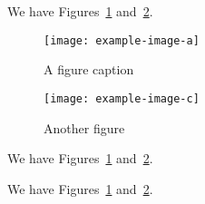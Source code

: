 \documentclass{article}
\begin{document}
We have Figures~\ref{fig:caption-a} and~\ref{fig:caption-c}.

\begin{figure}[ht]
  \centering\texttt{[image: example-image-a]}
  \caption{A figure caption}\label{fig:caption-a}
\end{figure}

\begin{figure}[ht]
  \centering\texttt{[image: example-image-c]}
  \caption{Another figure}\label{fig:caption-c}
\end{figure}

We have Figures~\ref{fig:caption-a} and~\ref{fig:caption-c}.

\pagebreak
We have Figures~\ref{fig:caption-a} and~\ref{fig:caption-c}.
\end{document}
